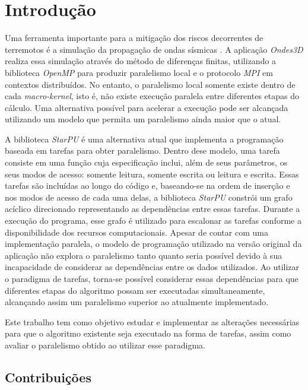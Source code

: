 \documentclass[cic,tc]{iiufrgs}
\begin{document}

\chapter{Introdução}
Uma ferramenta importante para a mitigação dos riscos decorrentes de terremotos é a simulação da propagação de ondas sísmicas \cite{Dupros2010HighperformanceFS}.
A aplicação \textit{Ondes3D} realiza essa simulação através do método de diferenças finitas, utilizando a biblioteca \textit{OpenMP} para
produzir paralelismo local e o protocolo \textit{MPI} em contextos distribuídos. No entanto, o paralelismo local somente existe dentro de cada
\textit{macro-kernel}, isto é, não existe execução paralela entre diferentes etapas do cálculo. Uma alternativa possível para acelerar a execução pode ser alcançada
utilizando um modelo que permita um paralelismo ainda maior que o atual. 

A biblioteca \textit{StarPU} é uma alternativa atual que implementa a programação baseada em tarefas para obter paralelismo. Dentro dese modelo, uma tarefa consiste
em uma função cuja especificação inclui, além de seus parâmetros, os seus modos de acesso: somente leitura, somente escrita ou leitura e escrita. Essas tarefas são
incluídas ao longo do código e, baseando-se na ordem de inserção e nos modos de acesso de cada uma delas, a biblioteca \textit{StarPU} constrói um grafo acíclico
direcionado representando as dependências entre essas tarefas. Durante a execução do programa, esse grafo é utilizado para escalonar as tarefas conforme a disponibilidade dos
recursos computacionais.
Apesar de contar com uma implementação paralela, o modelo de programação utilizado na versão original da aplicação não explora o paralelismo tanto quanto seria possível devido à sua
incapacidade de considerar as dependências entre os dados utilizados. Ao utilizar o paradigma de tarefas, torna-se possível considerar essas dependências para que diferentes etapas
do algoritmo possam ser executadas simultaneamente, alcançando assim um paralelismo superior ao atualmente implementado.

Este trabalho tem como objetivo estudar e implementar as alterações necessárias para que o algoritmo existente seja executado na forma de tarefas, assim como avaliar o paralelismo
obtido ao utilizar esse paradigma.

\section{Contribuições}
\end{document}
